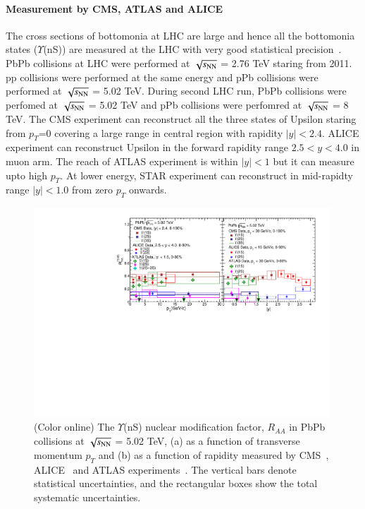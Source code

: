 \paragraph{Measurement by CMS, ATLAS and ALICE}
 The cross sections of bottomonia at LHC are large and hence all the 
bottomonia states ($\Upsilon$(nS)) are measured at the LHC with very good statistical
precision~\cite{Chatrchyan:2012lxa,Abelev:2014nua,Chatrchyan:2011pe,Khachatryan:2016xxp}.
 PbPb collisions at LHC were performed at $\sqrt{s_{\rm NN}}$ = 2.76 TeV staring from 
2011. pp collisions were performed at the same energy and pPb collisions were performed
at $\sqrt{s_{\rm NN}}$ = 5.02 TeV. 
During second LHC run, PbPb collisions were perfomed at $\sqrt{s_{\rm NN}}$ = 5.02 TeV 
and pPb collisions were perfomred at $\sqrt{s_{\rm NN}}$ = 8 TeV. 
The CMS experiment can reconstruct all the three states of Upsilon staring from
$p_T$=0 covering a large range in central region with rapidity $|y| < 2.4$.
ALICE experiment can reconstruct Upsilon in the forward rapidity range
$2.5 < y < 4.0$ in muon arm.
The reach of ATLAS experiment is within $|y| < 1$ but it can measure upto high $p_T$.
At lower energy, STAR experiment can reconstruct in mid-rapidty range
$|y| < 1.0$ from zero $p_T$ onwards. 

\begin{figure}
  \includegraphics[width=0.99\textwidth]{Figures/ExpOverview/Fig_LHC_YnSRAAPtRap.pdf}
  \caption{(Color online) The $\Upsilon$(nS) nuclear modification factor, $R_{AA}$
in PbPb collisions at $\sqrt{s_{\rm NN}}$ = 5.02 TeV, (a) as a function of transverse momentum $p_{T}$
    and (b) as a function of rapidity measured by CMS~\cite{CMS:2018zza}, ALICE~\cite{ALICE:2020wwx}
    and ATLAS experiments~\cite{ALICE:2020wwx}.
    The vertical bars denote statistical uncertainties, and the rectangular boxes
    show the total systematic uncertainties.
  }
  \label{fig:LHCYnSRAAPtRap}
\end{figure}


